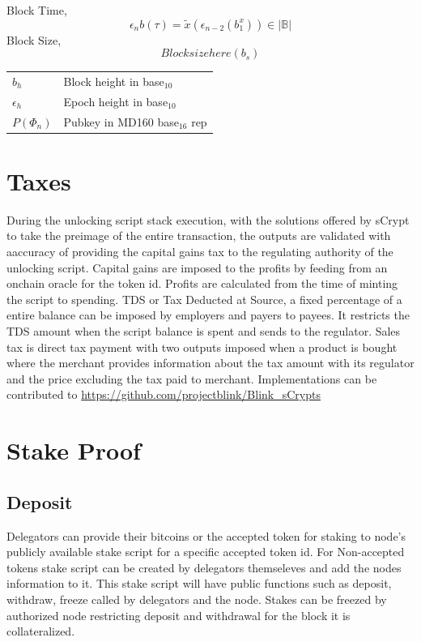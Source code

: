 \documentclass[a4paper,10pt]{article}
\makeatletter
\newenvironment{conditions}
  {\par\vspace{\abovedisplayskip}\noindent\begin{tabular}{>{$}l<{$} @{${}={}$} l}}
  {\end{tabular}\par\vspace{\belowdisplayskip}}
\makeatother
\begin{document}
Block Time,
\begin{equation*}
\epsilon_n b(\tau) = \widetilde{x}(\epsilon_{n-2}(b_1^x)) \in |\mathbb{B}|
\end{equation*}
Block Size,
\begin{equation}
Block size here (b_s)
\end{equation}
\begin{conditions}
b_h & Block height in base$_{10}$\\
\epsilon_h & Epoch height in base$_{10}$\\
P(\Phi_n) & Pubkey in MD160 base$_{16}$ rep
\end{conditions}
\section{Taxes}
During the unlocking script stack execution, with the solutions offered by sCrypt to take the preimage of the entire transaction, the outputs are validated with aaccuracy of providing the capital gains tax to the regulating authority of the unlocking script. Capital gains are imposed to the profits by feeding from an onchain oracle for the token id. Profits are calculated from the time of minting the script to spending. TDS or Tax Deducted at Source, a fixed percentage of a entire balance can be imposed by employers and payers to payees. It restricts the TDS amount when the script balance is spent and sends to the regulator. Sales tax is direct tax payment with two outputs imposed when a product is bought where the merchant provides information about the tax amount with its regulator and the price excluding the tax paid to merchant. Implementations can be contributed to \url{https://github.com/projectblink/Blink_sCrypts} 
\section{Stake Proof}
\subsection{Deposit}
Delegators can provide their bitcoins or the accepted token for staking to node's publicly available stake script for a specific accepted token id. For Non-accepted tokens stake script can be created by delegators themseleves and add the nodes information to it. 
This stake script will have public functions such as deposit, withdraw, freeze called by delegators and the node. Stakes can be freezed by authorized node restricting deposit and withdrawal for the block it is collateralized. 
\end{document}
